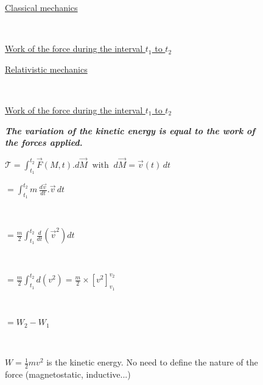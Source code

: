 \documentclass[12pt]{paper}
\newcommand{\F}{\ensuremath{\vec F}}
\newcommand{\vv}{\ensuremath{\vec v}}
\newcommand{\blue}{\color{blue}}
\begin{document}
\begin{figure}

\begin{minipage}[b]{.45\linewidth}
\centering
\Large

\blue 

\underline{Classical mechanics }

~

\underline{Work of the force during the interval  $t_1$ to $t_2$}


\end{minipage}
\begin{minipage}[b]{.54\linewidth}
\centering
\Large

\blue 

\underline{Relativistic mechanics}


~

\underline{Work of the force during the interval  $t_1$ to $t_2$}

\end{minipage}





\begin{center}
\textsl{\Large \bf The variation of the kinetic energy is equal to the work of the forces applied. }
\end{center}


\begin{minipage}[b]{.44\linewidth}
\centering
\Large

\blue 


$\mathcal{T} = \int_{t_1}^{t_2} \F(M,t) . d\vec M ~ \textrm{ with } ~  d\vec M = \vv(t) \, dt $


$= \int_{t_1}^{t_2} m\, \frac{ \textstyle{d\vv}}{\textstyle{dt}} . \vv \, dt $

~

$= \frac{ \textstyle{m}}{\textstyle{2}}\int_{t_1}^{t_2} \frac{ \textstyle{d}}{\textstyle{dt}}(\vv^2) dt $

~

$= \frac{ \textstyle{m}}{\textstyle{2}}\int_{t_1}^{t_2} d(v^2) 
= \frac{ \textstyle{m}}{\textstyle{2}} \times \left[ v^2   \right]_{v_1}^{v_2}$

~

$= W_2 - W_1  $

~

$W =\frac{ \textstyle{1}}{\textstyle{2}} m v^2$ is the kinetic energy.  No need to define the nature of the force (magnetostatic, inductive...)


~


\end{minipage}
\end{figure}
\end{document}
